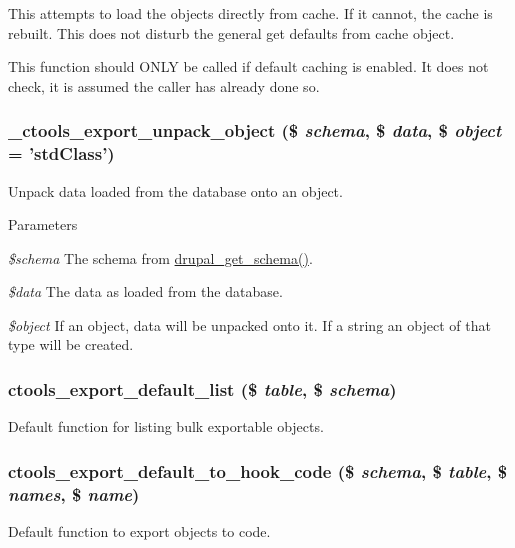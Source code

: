 This attempts to load the objects directly from cache. If it cannot, the cache is rebuilt. This does not disturb the general get defaults from cache object.

This function should ONLY be called if default caching is enabled. It does not check, it is assumed the caller has already done so. \hypertarget{export_8inc_adc4345fc217c5b8ca3099ea34f824a21}{
\subsubsection[{\_\-ctools\_\-export\_\-unpack\_\-object}]{\setlength{\rightskip}{0pt plus 5cm}\_\-ctools\_\-export\_\-unpack\_\-object (\$ {\em schema}, \/  \$ {\em data}, \/  \$ {\em object} = {\ttfamily 'stdClass'})}}
\label{export_8inc_adc4345fc217c5b8ca3099ea34f824a21}
Unpack data loaded from the database onto an object.


\begin{DoxyParams}{Parameters}
\item[{\em \$schema}]The schema from \hyperlink{group__schemaapi_ga979670bd6bd2e34337ffc5f0810f2d71}{drupal\_\-get\_\-schema()}. \item[{\em \$data}]The data as loaded from the database. \item[{\em \$object}]If an object, data will be unpacked onto it. If a string an object of that type will be created. \end{DoxyParams}
\hypertarget{export_8inc_a8da42c0a66938e72bd6651f03399e212}{
\subsubsection[{ctools\_\-export\_\-default\_\-list}]{\setlength{\rightskip}{0pt plus 5cm}ctools\_\-export\_\-default\_\-list (\$ {\em table}, \/  \$ {\em schema})}}
\label{export_8inc_a8da42c0a66938e72bd6651f03399e212}
Default function for listing bulk exportable objects. \hypertarget{export_8inc_a3d760199cfd97c57824512913257d3a1}{
\subsubsection[{ctools\_\-export\_\-default\_\-to\_\-hook\_\-code}]{\setlength{\rightskip}{0pt plus 5cm}ctools\_\-export\_\-default\_\-to\_\-hook\_\-code (\$ {\em schema}, \/  \$ {\em table}, \/  \$ {\em names}, \/  \$ {\em name})}}
\label{export_8inc_a3d760199cfd97c57824512913257d3a1}
Default function to export objects to code.

